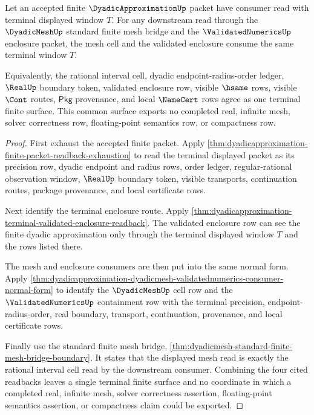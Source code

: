 \begin{theorem}
\label{thm:dyadicapproximation-terminal-mesh-enclosure-compatibility}
Let an accepted finite $\DyadicApproximationUp$ packet have consumer read with
terminal displayed window $T$. For any downstream read through the
$\DyadicMeshUp$ standard finite mesh bridge and the $\ValidatedNumericsUp$
enclosure packet, the mesh cell and the validated enclosure consume the same
terminal window $T$.

Equivalently, the rational interval cell, dyadic endpoint-radius-order ledger,
$\RealUp$ boundary token, validated enclosure row, visible $\hsame$ rows,
visible $\Cont$ routes, $\mathsf{Pkg}$ provenance, and local $\NameCert$ rows
agree as one terminal finite surface. This common surface exports no completed
real, infinite mesh, solver correctness row, floating-point semantics row, or
compactness row.
\end{theorem}
\begin{proof}
First exhaust the accepted finite packet. Apply
\autoref{thm:dyadicapproximation-finite-packet-readback-exhaustion} to read the
terminal displayed packet as its precision row, dyadic endpoint and radius
rows, order ledger, regular-rational observation window, $\RealUp$ boundary
token, visible transports, continuation routes, package provenance, and local
certificate rows.

Next identify the terminal enclosure route. Apply
\autoref{thm:dyadicapproximation-terminal-validated-enclosure-readback}. The
validated enclosure row can see the finite dyadic approximation only through
the terminal displayed window $T$ and the rows listed there.

The mesh and enclosure consumers are then put into the same normal form. Apply
\autoref{thm:dyadicapproximation-dyadicmesh-validatednumerics-consumer-normal-form}
to identify the $\DyadicMeshUp$ cell row and the $\ValidatedNumericsUp$
containment row with the terminal precision, endpoint-radius-order, real
boundary, transport, continuation, provenance, and local certificate rows.

Finally use the standard finite mesh bridge,
\autoref{thm:dyadicmesh-standard-finite-mesh-bridge-boundary}. It states that
the displayed mesh read is exactly the rational interval cell read by the
downstream consumer. Combining the four cited readbacks leaves a single
terminal finite surface and no coordinate in which a completed real, infinite
mesh, solver correctness assertion, floating-point semantics assertion, or
compactness claim could be exported.
\end{proof}
